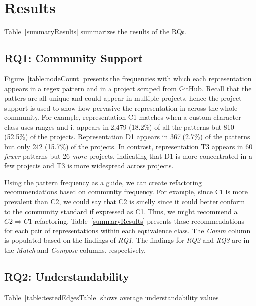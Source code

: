 \section{Results}
\label{sec:results}
Table~\ref{summaryResults} summarizes the results of the RQs.  



\subsection{RQ1: Community Support}
Figure~\ref{table:nodeCount} presents the frequencies with which each representation appears in a regex pattern and in a project scraped from GitHub. Recall that the patters are all unique and could appear in multiple projects, hence the project support is used to show how pervasive the representation in across the whole community. For example, representation C1 matches when a custom character class uses ranges and it appears in 2,479 (18.2\%) of all the patterns but 810 (52.5\%) of the projects. Representation D1 appears in 367 (2.7\%) of the patterns but only 242 (15.7\%) of the projects. In contrast, representation T3 appears in 60 \emph{fewer} patterns but 26 \emph{more} projects, indicating that D1 is more concentrated in a few projects and T3 is more widespread across projects. 

Using the pattern frequency as a guide, we can create refactoring recommendations based on community frequency. For example, since C1 is more prevalent than C2, we could say that C2 is smelly since it could better conform to the community standard if expressed as C1. Thus, we might recommend a $C2 \Rightarrow C1$ refactoring. Table~\ref{summaryResults} presents these recommendations for each pair of representations within each equivalence class. The \emph{Comm} column is populated based on the findings of \emph{RQ1}. The findings for \emph{RQ2} and \emph{RQ3} are in the \emph{Match} and \emph{Compose} columns, respectively. 




\subsection{RQ2: Understandability}
Table~\ref{table:testedEdgesTable} shows average understandability values. 

